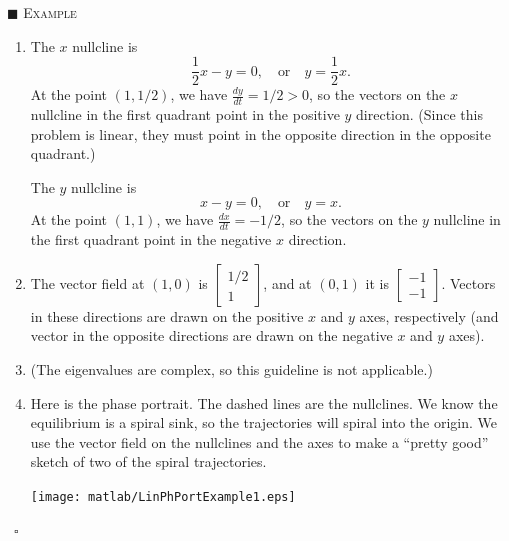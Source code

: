 \documentclass[reqno]{immbook}
\numberwithin{equation}{chapter}
\numberwithin{question}{section}
\numberwithin{theorem}{chapter}
\numberwithin{figure}{chapter}
\theoremstyle{definition}
\newenvironment{xexample}%
{%

\medskip\noindent\addtocounter{example}{1}$\blacksquare$ \textsc{Example \theexample}\hspace*{1em}%
}%
{%
~\hfill$\square$

\medskip
}
\begin{document}
\begin{xexample}
\begin{enumerate}
\begin{multline}
         \sin\left(\sqrt{7}t/4\right) \right\} \\
	 +
	  c_2 e^{-(1/4)t}
	 \left\{
	 \begin{bmatrix} 1 \\ \frac{3}{4} \end{bmatrix}
	   \sin\left( \sqrt{7}t/4 \right)
	  +
	 \begin{bmatrix} 0 \\ -\frac{\sqrt{7}}{4} \end{bmatrix}
	   \cos \left( \sqrt{7}t/4 \right)
	   \right\}
\end{multline}

\item
The $x$ nullcline is
\[
    \frac{1}{2} x - y = 0, \quad \textrm{or} \quad y = \frac{1}{2}x.
\]
At the point $(1,1/2)$, we have $\frac{dy}{dt} = 1/2 > 0$, so the
vectors on the $x$ nullcline in the first quadrant point in the
positive $y$ direction. (Since this problem is linear, they
must point in the opposite direction in the opposite quadrant.)

The $y$ nullcline is
\[
  x - y = 0, \quad \textrm{or} \quad y = x.
\]
At the point $(1,1)$, we have $\frac{dx}{dt} = -1/2$, so the
vectors on the $y$ nullcline in the first quadrant point
in the negative $x$ direction.
\item The vector field at $(1,0)$ is
$\begin{bmatrix} 1/2 \\ 1\end{bmatrix}$, and at $(0,1)$ it
is
$\begin{bmatrix} -1 \\ -1 \end{bmatrix}$.
Vectors in these directions are drawn on the positive
$x$ and $y$ axes, respectively (and vector in the opposite
directions are drawn on the negative $x$ and $y$ axes).
\item
(The eigenvalues are complex, so this guideline is not
applicable.)
\item
Here is the phase portrait.  The dashed lines are the nullclines.
We know the equilibrium is a spiral sink, so the trajectories
will spiral into the origin.  We use the vector field on the
nullclines and the axes to make a ``pretty good'' sketch
of two of the spiral trajectories.

\medskip
\noindent
\centerline{\texttt{[image: matlab/LinPhPortExample1.eps]}}
\end{enumerate}
\end{xexample}
\end{document}

